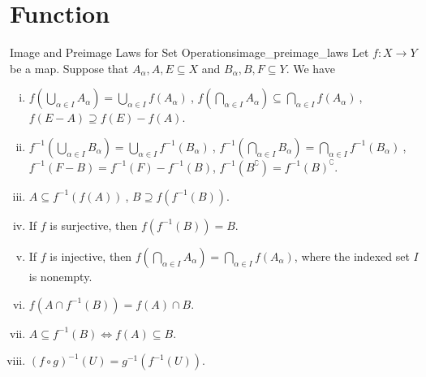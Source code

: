 \section{Function}
\begin{proposition}{Image and Preimage Laws for Set Operations}{image_preimage_laws}
Let $f:X\to Y$ be a map. Suppose that $A_\alpha,A,E\subseteq X$ and $B_\alpha,B,F\subseteq Y$. We have
\begin{enumerate}[(i)]
	\item $f\left(\bigcup\limits_{\alpha\in I}A_\alpha\right)=\bigcup\limits_{\alpha\in I}f\left(A_\alpha\right)\ $, $f\left(\bigcap\limits_{\alpha\in I}A_\alpha\right)\subseteq\bigcap\limits_{\alpha\in I}f\left(A_\alpha\right)\ $, $f(E-A)\supseteq f(E)-f(A)$.
	\item $f^{-1}\left(\bigcup\limits_{\alpha\in I}B_\alpha\right)=\bigcup\limits_{\alpha\in I}f^{-1}\left(B_\alpha\right)\ $, $f^{-1}\left(\bigcap\limits_{\alpha\in I}B_\alpha\right)=\bigcap\limits_{\alpha\in I}f^{-1}\left(B_\alpha\right)\ $, $f^{-1}(F-B)=f^{-1}(F)-f^{-1}(B)$, $f^{-1}\left(B^{\complement}\right)=f^{-1}\left(B\right)^{\complement}$.
	\item $A\subseteq f^{-1}(f(A))\ $, $B\supseteq f(f^{-1}(B))$.
    \item If $f$ is surjective, then $f\left(f^{-1}(B)\right)=B$.
    \item If $f$ is injective, then $f\left(\bigcap\limits_{\alpha\in I}A_\alpha\right)=\bigcap\limits_{\alpha\in I}f\left(A_\alpha\right)$, where the indexed set $I$ is nonempty.
    \item $f\left(A\cap f^{-1}(B)\right)=f(A)\cap B$.
    \item $A\subseteq f^{-1}(B) \iff f(A)\subseteq B$.
    \item $(f\circ g)^{-1}(U) = g^{-1}\left(f^{-1}(U)\right)$.
\end{enumerate}
\end{proposition}
